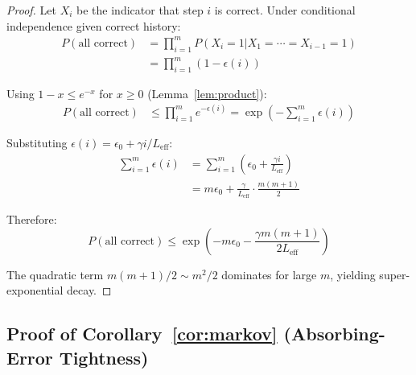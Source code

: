 \documentclass{article}
\theoremstyle{plain}
\theoremstyle{definition}
\theoremstyle{remark}
\newcommand{\Leff}{L_{\mathrm{eff}}}
\begin{document}
\begin{proof}
Let $X_i$ be the indicator that step $i$ is correct. Under conditional independence given correct history:
\begin{align}
P(\text{all correct}) &= \prod_{i=1}^{m} P(X_i = 1 | X_1 = \cdots = X_{i-1} = 1) \\
&= \prod_{i=1}^{m} (1 - \epsilon(i))
\end{align}

Using $1 - x \leq e^{-x}$ for $x \geq 0$ (Lemma~\ref{lem:product}):
\begin{align}
P(\text{all correct}) &\leq \prod_{i=1}^{m} e^{-\epsilon(i)} = \exp\left(-\sum_{i=1}^{m} \epsilon(i)\right)
\end{align}

Substituting $\epsilon(i) = \epsilon_0 + \gamma i / \Leff$:
\begin{align}
\sum_{i=1}^{m} \epsilon(i) &= \sum_{i=1}^{m} \left(\epsilon_0 + \frac{\gamma i}{\Leff}\right) \\
&= m\epsilon_0 + \frac{\gamma}{\Leff} \cdot \frac{m(m+1)}{2}
\end{align}

Therefore:
\begin{equation}
P(\text{all correct}) \leq \exp\left(-m\epsilon_0 - \frac{\gamma m(m+1)}{2\Leff}\right)
\end{equation}

The quadratic term $m(m+1)/2 \sim m^2/2$ dominates for large $m$, yielding super-exponential decay.
\end{proof}

\subsection{Proof of Corollary~\ref{cor:markov} (Absorbing-Error Tightness)}
\end{document}
